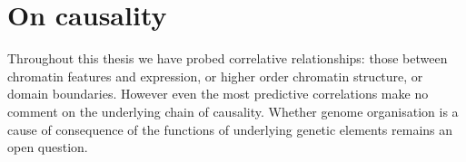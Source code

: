 \documentclass[a4paper,11pt,oneside]{book}
\begin{document}


\section{On causality}


Throughout this thesis we have probed correlative relationships: those between chromatin features and expression, or higher order chromatin structure, or domain boundaries. However even the most predictive correlations make no comment on the underlying chain of causality. Whether genome organisation is a cause of consequence of the functions of underlying genetic elements remains an open question.\cite{Sexton2015}
\end{document}
